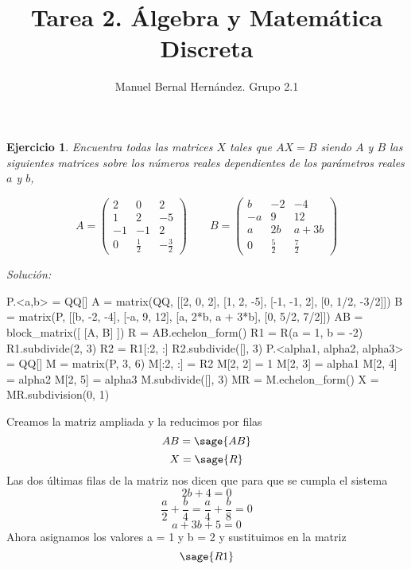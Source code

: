 \documentclass{amsart}
\title{Tarea 2. Álgebra y Matemática Discreta}
\author{Manuel Bernal Hernández. Grupo 2.1}
\newtheorem{ejer}{Ejercicio}
\begin{document}
\maketitle

\begin{ejer}
Encuentra todas las matrices $X$ tales que $AX = B$ siendo $A$ y $B$ las
siguientes matrices sobre los números reales dependientes de los parámetros
reales $a$ y $b$, 

\[
A = \left(\begin{array}{rrr}
2 & 0 & 2 \\
1 & 2 & -5 \\
-1 & -1 & 2 \\
0 & \frac{1}{2} & -\frac{3}{2}
\end{array}\right) \qquad
B = \left(\begin{array}{rrr}
b  & -2 & -4 \\
-a & 9 & 12 \\
a  & 2b & a+3b \\
0 & \frac{5}{2} & \frac{7}{2}
\end{array}\right)
\]
\end{ejer}
{\it Solución: }

\begin{sageblock}
P.<a,b> = QQ[]
A = matrix(QQ, [[2, 0, 2], [1, 2, -5], [-1, -1, 2], [0, 1/2, -3/2]])
B = matrix(P, [[b, -2, -4], [-a, 9, 12], [a, 2*b, a + 3*b], [0, 5/2, 7/2]])
AB = block_matrix([ [A, B] ])
R = AB.echelon_form()
R1 = R(a = 1, b = -2)
R1.subdivide(2, 3)
R2 = R1[:2, :]
R2.subdivide([], 3)
P.<alpha1, alpha2, alpha3> = QQ[]
M = matrix(P, 3, 6)
M[:2, :] = R2
M[2, 2] = 1
M[2, 3] = alpha1
M[2, 4] = alpha2
M[2, 5] = alpha3
M.subdivide([], 3)
MR = M.echelon_form()
X = MR.subdivision(0, 1)
\end{sageblock}

Creamos la matriz ampliada y la reducimos por filas
$$ AB = \sage{AB} $$
$$ X = \sage{R} $$
Las dos últimas filas de la matriz nos dicen que para que se cumpla el sistema
$$ 2b + 4 = 0 $$
$$ \frac{a}{2} + \frac{b}{4} = \frac{a}{4} + \frac{b}{8} = 0 $$
$$ a + 3b + 5 = 0 $$
Ahora asignamos los valores a = 1 y b = 2 y sustituimos en la matriz
$$ \sage{R1} $$
\end{document}
